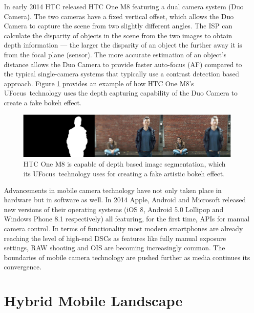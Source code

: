 \documentclass[thesis.tex]{subfiles}
\begin{document}
In early 2014 HTC released HTC One M8 featuring a dual camera system (Duo Camera). The two cameras have a fixed vertical offset, which allows the Duo Camera to capture the scene from two slightly different angles. The ISP can calculate the disparity of objects in the scene from the two images to obtain depth information --- the larger the disparity of an object the further away it is from the focal plane (sensor). The more accurate estimation of an object's distance allows the Duo Camera to provide faster auto-focus (AF) compared to the typical single-camera systems that typically use a contrast detection based approach. Figure \ref{figure:htc-ufocus} provides an example of how HTC One M8's UFocus\texttrademark\ technology uses the depth capturing capability of the Duo Camera to create a fake bokeh effect.

\begin{figure}[h]
\centering \includegraphics[width=\textwidth]{images/htc-ufocus.jpg}
\caption{HTC One M8 is capable of depth based image segmentation, which its UFocus\texttrademark\ technology uses for creating a fake artistic bokeh effect.\label{figure:htc-ufocus}}
\end{figure}

Advancements in mobile camera technology have not only taken place in hardware but in software as well. In 2014 Apple, Android and Microsoft released new versions of their operating systems (iOS 8, Android 5.0 Lollipop and Windows Phone 8.1 respectively) all featuring, for the first time, APIs for manual camera control. In terms of functionality most modern smartphones are already reaching the level of high-end DSCs as features like fully manual exposure settings, RAW shooting and OIS are becoming increasingly common. The boundaries of mobile camera technology are pushed further as media continues its convergence.

\section{Hybrid Mobile Landscape}
\label{section:hybrid_mobile_landscape}
\end{document}
